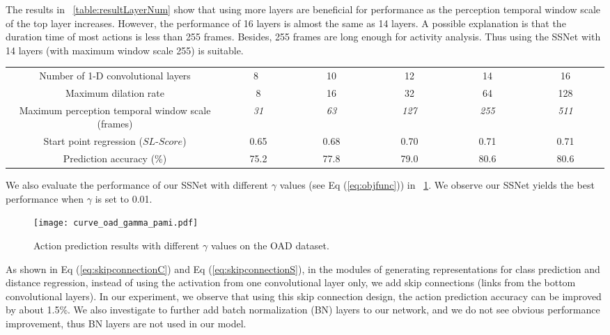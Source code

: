 \documentclass[10pt,twocolumn,letterpaper]{article}
\begin{document}
The results in \tablename{~\ref{table:resultLayerNum}} show that
using more layers are beneficial for performance as the perception temporal window scale of the top layer increases.
However, the performance of 16 layers is almost the same as 14 layers.
A possible explanation is that the duration time of most actions is less than 255 frames.
Besides, 255 frames are long enough for activity analysis.
Thus using the SSNet with 14 layers (with maximum window scale 255) is suitable.
\begin{table*}[tbp]
	\caption{Evaluation of different configurations of the proposed network on the OAD dataset.}
	\label{table:resultLayerNum}
	\centering
	\small
	\begin{tabular}{cccccc}
		\toprule
Number of 1-D convolutional layers                &~~~~~8~~~~~~&  ~~~~~~10~~~~~~ & ~~~~~~12~~~~~~   & ~~~~~~14~~~~~~   & ~~~~~~16~~~~~~   \\
		Maximum dilation rate                             &      8     &       16        &      32          &      64          &      128     \\
		Maximum perception temporal window scale (frames) & \emph{31}  &  \emph{63}      &    \emph{127}    &   \emph{255}     & \emph{511}   \\
		\midrule
		Start point regression ($SL$-$Score$)             &   0.65     &     0.68        &     0.70         &     0.71         &    0.71  \\
		Prediction accuracy (\%)                          &   75.2     &     77.8        &     79.0         &     80.6         &    80.6 \\
		\bottomrule
	\end{tabular}
\end{table*}

We also evaluate the performance of our SSNet with different $\gamma$ values (see Eq (\ref{eq:objfunc}))
in \figurename{~\ref{fig:result_curves_ChaLearn_gamma}}.
We observe our SSNet yields the best performance when $\gamma$ is set to 0.01.

\begin{figure}[tbp]
		\centering
		\centerline{\texttt{[image: curve\_oad\_gamma\_pami.pdf]}}
	\caption{Action prediction results with different $\gamma$ values on the OAD dataset.}
	\label{fig:result_curves_ChaLearn_gamma}
\end{figure}

As shown in Eq (\ref{eq:skipconnectionC}) and Eq (\ref{eq:skipconnectionS}),
in the modules of generating representations for class prediction and distance regression,
instead of using the activation from one convolutional layer only,
we add skip connections (links from the bottom convolutional layers).
In our experiment, we observe that using this skip connection design, the action prediction accuracy can be improved by about 1.5\%.
We also investigate to further add batch normalization (BN) layers \cite{ioffe2015batch} to our network,
and we do not see obvious performance improvement,
thus BN layers are not used in our model.
\end{document}
